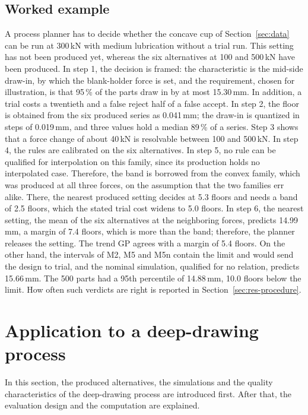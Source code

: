 \documentclass[pdflatex,sn-basic,lineno]{sn-jnl}
\begin{document}
\subsection{Worked example}\label{sec:example}

A process planner has to decide whether the concave cup of Section~\ref{sec:data} can be run at 300\,kN with medium lubrication without a trial run. This setting has not been produced yet, whereas the six alternatives at 100 and 500\,kN have been produced. In step 1, the decision is framed: the characteristic is the mid-side draw-in, by which the blank-holder force is set, and the requirement, chosen for illustration, is that 95\,\% of the parts draw in by at most 15.30\,mm. In addition, a trial costs a twentieth and a false reject half of a false accept. In step 2, the floor is obtained from the six produced series as 0.041\,mm; the draw-in is quantized in steps of 0.019\,mm, and three values hold a median 89\,\% of a series. Step 3 shows that a force change of about 40\,kN is resolvable between 100 and 500\,kN. In step 4, the rules are calibrated on the six alternatives. In step 5, no rule can be qualified for interpolation on this family, since its production holds no interpolated case. Therefore, the band is borrowed from the convex family, which was produced at all three forces, on the assumption that the two families err alike. There, the nearest produced setting decides at 5.3 floors and needs a band of 2.5 floors, which the stated trial cost widens to 5.0 floors. In step 6, the nearest setting, the mean of the six alternatives at the neighboring forces, predicts 14.99\,mm, a margin of 7.4 floors, which is more than the band; therefore, the planner releases the setting. The trend GP agrees with a margin of 5.4 floors. On the other hand, the intervals of M2, M5 and M5n contain the limit and would send the design to trial, and the nominal simulation, qualified for no relation, predicts 15.66\,mm. The 500 parts had a 95th percentile of 14.88\,mm, 10.0 floors below the limit. How often such verdicts are right is reported in Section~\ref{sec:res-procedure}.

\section{Application to a deep-drawing process}\label{sec:demo}

In this section, the produced alternatives, the simulations and the quality characteristics of the deep-drawing process are introduced first. After that, the evaluation design and the computation are explained.
\end{document}
